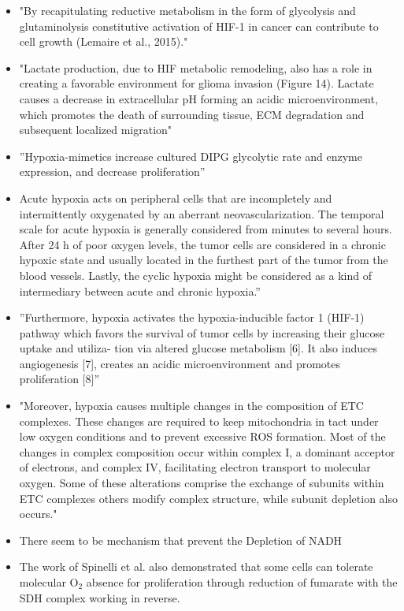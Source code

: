 \documentclass[11pt,a4paper]{article}
\begin{document}
\begin{itemize}
\item "By recapitulating reductive metabolism in the form of glycolysis and glutaminolysis constitutive activation of HIF-1 in cancer can contribute to cell growth (Lemaire et al., 2015)." \cite{Strickland2017}
\item "Lactate production, due to HIF metabolic remodeling, also
has a role in creating a favorable environment for glioma
invasion (Figure 14). Lactate causes a decrease in extracellular pH forming an acidic microenvironment, which promotes the death of surrounding tissue, ECM degradation and subsequent localized migration" \cite{Strickland2017}
\item ”Hypoxia-mimetics increase cultured DIPG glycolytic rate and enzyme expression, and decrease proliferation” \cite{Waker2018}
\item Acute hypoxia acts on peripheral cells that are incompletely and intermittently oxygenated by an aberrant neovascularization. The temporal scale for acute hypoxia is generally considered from minutes to several hours. After 24 h of poor oxygen levels, the tumor cells are considered in a chronic hypoxic state and usually located in the furthest part of the tumor from the blood vessels. Lastly, the cyclic hypoxia might be considered as a kind of intermediary between acute and chronic hypoxia.”\cite{Fuchs2020}
\item ”Furthermore, hypoxia activates the hypoxia-inducible factor 1 (HIF-1) pathway which favors the survival of tumor cells by increasing their glucose uptake and utiliza-
tion via altered glucose metabolism [6]. It also induces angiogenesis [7], creates an acidic microenvironment and promotes proliferation [8]”\cite{Shen2020}
\item "Moreover, hypoxia causes multiple changes in the
composition of ETC complexes. These changes are required to keep mitochondria in tact under low oxygen conditions and to prevent excessive ROS formation. Most of the changes in complex composition occur within complex I, a dominant acceptor of electrons, and complex IV, facilitating electron transport to molecular oxygen. Some of these alterations comprise the exchange of subunits within ETC complexes others modify complex structure, while subunit depletion also occurs." \cite{Fuhrmann2017}
\item There seem to be mechanism that prevent the Depletion of NADH \cite{Yan2020}
\item The work of Spinelli et al. also demonstrated that some cells can tolerate molecular O$_{2}$ absence for proliferation through reduction of fumarate with the SDH complex working in reverse. \cite{Spinelli2021}

\end{itemize}
\end{document}
